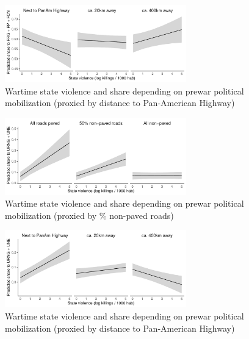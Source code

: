 \documentclass[a4paper, 12pt, notitlepage]{article}
\begin{document}
\begin{figure}[htb!]
  \centering
    \includegraphics[width = 0.7\textwidth]{img/pp_fulldcha_panam}

  \caption{Wartime state violence and {} share depending on prewar political mobilization (proxied by distance to Pan-American Highway)} \label{fig:pp_fulldcha_panam}

\end{figure}

\begin{figure}[htb!]
  \centering
    \includegraphics[width = 0.7\textwidth]{img/pp_fullizq_roads}

  \caption{Wartime state violence and {} share depending on prewar political mobilization (proxied by \% non-paved roads)} \label{fig:pp_fullizq_roads}

\end{figure}

\begin{figure}[htb!]
  \centering
    \includegraphics[width = 0.7\textwidth]{img/pp_fullizq_panam}

  \caption{Wartime state violence and {} share depending on prewar political mobilization (proxied by distance to Pan-American Highway)} \label{fig:pp_fullizq_panam}

\end{figure}
\end{document}
